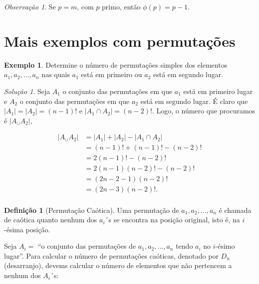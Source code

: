 \documentclass[]{book}
\theoremstyle{definition}
\newtheorem{definition}{Definição}[chapter]
\theoremstyle{definition}
\newtheorem{example}{Exemplo}[chapter]
\theoremstyle{definition}
\theoremstyle{remark}
\newtheorem*{remark}{Observação}
\newtheorem*{solution}{Solução}
\begin{document}
\begin{remark}
\iffalse{} {Observação. } \fi{}Se \(p=m\), com \(p\) primo, então \(\phi(p)=p-1.\)
\end{remark}

\hypertarget{mais-exemplos-com-permutauxe7uxf5es}{%
\section{Mais exemplos com permutações}\label{mais-exemplos-com-permutauxe7uxf5es}}

\begin{example}
\protect\hypertarget{exm:unnamed-chunk-79}{}{\label{exm:unnamed-chunk-79} }Determine o número de permutações simples dos elementos \(a_1, a_2, \ldots, a_n\) nas quais \(a_1\) está em primeiro ou \(a_2\) está em segundo lugar.
\end{example}

\begin{solution}
\iffalse{} {Solução. } \fi{}Seja \(A_1\) o conjunto das permutações em que \(a_1\) está em primeiro lugar e \(A_2\) o conjunto das permutações em que \(a_2\) está em segundo lugar.
É claro que \(|A_1|=|A_2|=(n-1)!\) e \(|A_1 \cap A_2| = (n-2)!\).
Logo, o número que procuramos é \(|A_\cup A_2|\),

\begin{align}
|A_\cup A_2| &= |A_1| + |A_2| - |A_1 \cap A_2| \\
&= (n-1)! + (n-1)! - (n-2)!\\
&= 2(n-1)! - (n-2)!\\
&= 2(n-1)(n-2)! - (n-2)!\\
&= (2n - 2-1)(n-2)!\\
&= (2n-3)(n-2)!.\\
\end{align}
\end{solution}

\begin{definition}[Permutação Caótica]
\protect\hypertarget{def:defPermCaotica}{}{\label{def:defPermCaotica} \iffalse (Permutação Caótica) \fi{} }Uma permutação de \(a_1, a_2, \ldots, a_n\) é chamada de caótica quanto nenhum dos \(a_i\)´s se encontra na posição original, isto é, na \(i\)-ésima posição.
\end{definition}

Seja \(A_i=\) ``o conjunto das permutações de \(a_1, a_2, \ldots, a_n\) tendo \(a_i\) no \(i\)-ésimo lugar''.
Para calcular o número de permutações caóticas, denotado por \(D_n\) (desarranjo), devems calcular o número de elementos que não pertencem a nenhum dos \(A_i\)´s:
\end{document}
